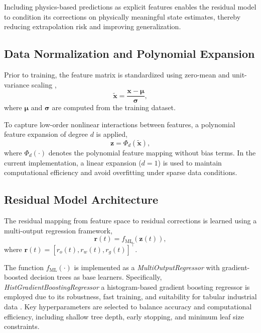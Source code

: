 \documentclass[12pt,APA]{uomthesis}
\begin{document}
Including physics-based predictions as explicit features enables the residual model to condition its corrections on physically meaningful state estimates, thereby reducing extrapolation risk and improving generalization.

\subsection{Data Normalization and Polynomial Expansion}
Prior to training, the feature matrix is standardized using zero-mean and unit-variance scaling \citep{hastie2009elements},
\begin{equation}
\tilde{\mathbf{x}} = \frac{\mathbf{x} - \boldsymbol{\mu}}{\boldsymbol{\sigma}},
\end{equation}
where $\boldsymbol{\mu}$ and $\boldsymbol{\sigma}$ are computed from the training dataset.

To capture low-order nonlinear interactions between features, a polynomial feature expansion of degree $d$ is applied,
\begin{equation}
\mathbf{z} = \Phi_d(\tilde{\mathbf{x}}),
\end{equation}
where $\Phi_d(\cdot)$ denotes the polynomial feature mapping without bias terms. In the current implementation, a linear expansion ($d=1$) is used to maintain computational efficiency and avoid overfitting under sparse data conditions.

\subsection{Residual Model Architecture}
The residual mapping from feature space to residual corrections is learned using a multi-output regression framework,
\begin{equation}
\mathbf{r}(t) = f_{\text{ML}}(\mathbf{z}(t)),
\end{equation}
where $\mathbf{r}(t) = [r_o(t), r_w(t), r_g(t)]^\top$.

The function $f_{\text{ML}}(\cdot)$ is implemented as a \textit{MultiOutputRegressor} with gradient-boosted decision trees as base learners. Specifically, \textit{HistGradientBoostingRegressor} a histogram-based gradient boosting regressor is employed due to its robustness, fast training, and suitability for tabular industrial data \citep{friedman2001greedy}. Key hyperparameters are selected to balance accuracy and computational efficiency, including shallow tree depth, early stopping, and minimum leaf size constraints.
\end{document}
